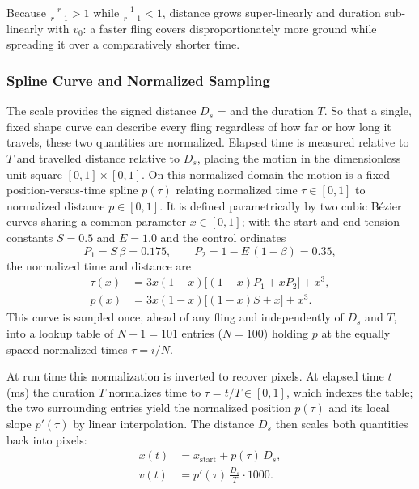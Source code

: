 Because $\tfrac{r}{r-1} > 1$ while $\tfrac{1}{r-1} < 1$, distance grows super-linearly and duration sub-linearly with $v_0$: a faster fling covers disproportionately more ground while spreading it over a comparatively shorter time.

\subsubsection{Spline Curve and Normalized Sampling}

The scale provides the signed distance $D_s$ =  and the duration $T$. So that a single, fixed shape curve can describe every fling regardless of how far or how long it travels, these two quantities are normalized. Elapsed time is measured relative to $T$ and travelled distance relative to $D_s$, placing the motion in the dimensionless unit square $[0,1]\times[0,1]$. On this normalized domain the motion is a fixed position-versus-time spline $p(\tau)$ relating normalized time $\tau \in [0,1]$ to normalized distance $p \in [0,1]$. It is defined parametrically by two cubic B\'ezier curves sharing a common parameter $x \in [0,1]$; with the start and end tension constants $S = 0.5$ and $E = 1.0$ and the control ordinates
\begin{equation}
  P_1 = S\,\beta = 0.175,
  \qquad
  P_2 = 1 - E\,(1-\beta) = 0.35,
  \label{eq:sd-control-points}
\end{equation}
the normalized time and distance are
\begin{align}
  \tau(x) &= 3x(1-x)\big[(1-x)P_1 + x P_2\big] + x^3, \label{eq:sd-spline-time}\\
  p(x)    &= 3x(1-x)\big[(1-x)S + x\big] + x^3. \label{eq:sd-spline-pos}
\end{align}
This curve is sampled once, ahead of any fling and independently of $D_s$ and $T$, into a lookup table of $N+1 = 101$ entries ($N = 100$) holding $p$ at the equally spaced normalized times $\tau = i/N$.

At run time this normalization is inverted to recover pixels. At elapsed time $t$ (ms) the duration $T$ normalizes time to $\tau = t/T \in [0,1]$, which indexes the table; the two surrounding entries yield the normalized position $p(\tau)$ and its local slope $p'(\tau)$ by linear interpolation. The distance $D_s$ then scales both quantities back into pixels:
\begin{align}
  x(t) &= x_{\text{start}} + p(\tau)\,D_s, \label{eq:sd-spline-position}\\[2pt]
  v(t) &= p'(\tau)\,\frac{D_s}{T}\cdot 1000. \label{eq:sd-spline-velocity}
\end{align}

